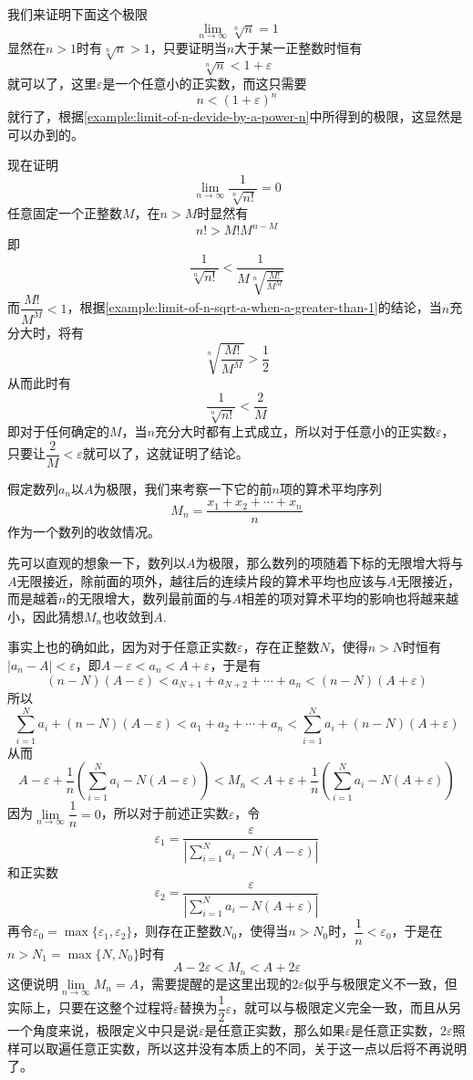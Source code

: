 \begin{example}
  我们来证明下面这个极限
  \[ \lim_{n \to \infty} \sqrt[n]{n} = 1 \]
  显然在$n>1$时有$\sqrt[n]{n}>1$，只要证明当$n$大于某一正整数时恒有
  \[ \sqrt[n]{n}<1+\varepsilon \]
  就可以了，这里$\varepsilon$是一个任意小的正实数，而这只需要
  \[ n < (1+\varepsilon)^n \]
  就行了，根据\autoref{example:limit-of-n-devide-by-a-power-n}中所得到的极限，这显然是可以办到的。
\end{example}

\begin{example}
  现在证明
  \[ \lim_{n \to \infty} \frac{1}{\sqrt[n]{n!}} = 0 \]
  任意固定一个正整数$M$，在$n>M$时显然有
  \[ n!>M!M^{n-M} \]
  即
  \[ \frac{1}{\sqrt[n]{n!}} < \frac{1}{M \sqrt[n]{\frac{M!}{M^M}}} \]
  而$\dfrac{M!}{M^M}<1$，根据\autoref{example:limit-of-n-sqrt-a-when-a-greater-than-1}的结论，当$n$充分大时，将有
  \[ \sqrt[n]{\frac{M!}{M^M}} > \frac{1}{2} \]
  从而此时有
  \[ \frac{1}{\sqrt[n]{n!}} < \frac{2}{M} \]
  即对于任何确定的$M$，当$n$充分大时都有上式成立，所以对于任意小的正实数$\varepsilon$，只要让$\dfrac{2}{M}<\varepsilon$就可以了，这就证明了结论。
\end{example}

\begin{example}
  \label{example:mean-value-of-converge-number-sequence}
  假定数列$a_n$以$A$为极限，我们来考察一下它的前$n$项的算术平均序列
  \[ M_n=\frac{x_1+x_2+\cdots+x_n}{n} \]
  作为一个数列的收敛情况。

  先可以直观的想象一下，数列以$A$为极限，那么数列的项随着下标的无限增大将与$A$无限接近，除前面的项外，越往后的连续片段的算术平均也应该与$A$无限接近，而是越着$n$的无限增大，数列最前面的与$A$相差的项对算术平均的影响也将越来越小，因此猜想$M_n$也收敛到$A$.

  事实上也的确如此，因为对于任意正实数$\varepsilon$，存在正整数$N$，使得$n>N$时恒有$|a_n-A|<\varepsilon$，即$A-\varepsilon<a_n<A+\varepsilon$，于是有
  \[ (n-N)(A-\varepsilon) < a_{N+1}+a_{N+2}+\cdots+a_n < (n-N)(A+\varepsilon) \]
  所以
  \[ \sum_{i=1}^Na_i + (n-N)(A-\varepsilon) < a_{1}+a_{2}+\cdots+a_n < \sum_{i=1}^Na_i + (n-N)(A+\varepsilon) \]
  从而
  \[ A-\varepsilon + \frac{1}{n} \left( \sum_{i=1}^Na_i - N(A-\varepsilon) \right) < M_n <  A+\varepsilon + \frac{1}{n} \left( \sum_{i=1}^Na_i - N(A+\varepsilon) \right)\]
  因为$\lim\limits_{n \to \infty}\dfrac{1}{n} = 0$，所以对于前述正实数$\varepsilon$，令
  \[ \varepsilon_1= \frac{\varepsilon}{\left| \sum_{i=1}^Na_i - N(A-\varepsilon) \right|} \]
  和正实数
  \[ \varepsilon_2= \frac{\varepsilon}{\left| \sum_{i=1}^Na_i - N(A+\varepsilon) \right|} \]
  再令$\varepsilon_0=\max\{\varepsilon_1,\varepsilon_2\}$，则存在正整数$N_0$，使得当$n>N_0$时，$\dfrac{1}{n}<\varepsilon_0$，于是在$n>N_1=\max\{N,N_0\}$时有
  \[ A-2\varepsilon < M_n < A+2\varepsilon \]
  这便说明$\lim\limits_{n \to \infty}M_n = A$，需要提醒的是这里出现的$2\varepsilon$似乎与极限定义不一致，但实际上，只要在这整个过程将$\varepsilon$替换为$\dfrac{1}{2}\varepsilon$，就可以与极限定义完全一致，而且从另一个角度来说，极限定义中只是说$\varepsilon$是任意正实数，那么如果$\varepsilon$是任意正实数，$2\varepsilon$照样可以取遍任意正实数，所以这并没有本质上的不同，关于这一点以后将不再说明了。
\end{example}

